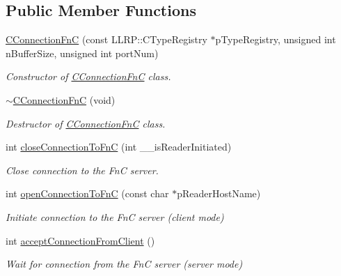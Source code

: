 \subsection*{Public Member Functions}
\begin{DoxyCompactItemize}
\item 
\hyperlink{class_e_l_f_i_n_1_1_c_connection_fn_c_a7f75c79f20a7d439266094d826dfca23}{C\-Connection\-Fn\-C} (const L\-L\-R\-P\-::\-C\-Type\-Registry $\ast$p\-Type\-Registry, unsigned int n\-Buffer\-Size, unsigned int port\-Num)
\begin{DoxyCompactList}\small\item\em Constructor of \hyperlink{class_e_l_f_i_n_1_1_c_connection_fn_c}{C\-Connection\-Fn\-C} class. \end{DoxyCompactList}\item 
\hyperlink{class_e_l_f_i_n_1_1_c_connection_fn_c_a0f88955ac24427bc224c8970a3e40016}{$\sim$\-C\-Connection\-Fn\-C} (void)
\begin{DoxyCompactList}\small\item\em Destructor of \hyperlink{class_e_l_f_i_n_1_1_c_connection_fn_c}{C\-Connection\-Fn\-C} class. \end{DoxyCompactList}\item 
int \hyperlink{class_e_l_f_i_n_1_1_c_connection_fn_c_a36cce7a57378de89fc5a03fb39092348}{close\-Connection\-To\-Fn\-C} (int \-\_\-\-\_\-is\-Reader\-Initiated)
\begin{DoxyCompactList}\small\item\em Close connection to the Fn\-C server. \end{DoxyCompactList}\item 
int \hyperlink{class_e_l_f_i_n_1_1_c_connection_fn_c_aade173f8606de8d853344752b4e18678}{open\-Connection\-To\-Fn\-C} (const char $\ast$p\-Reader\-Host\-Name)
\begin{DoxyCompactList}\small\item\em Initiate connection to the Fn\-C server (client mode) \end{DoxyCompactList}\item 
int \hyperlink{class_e_l_f_i_n_1_1_c_connection_fn_c_a452088817621707bb340b6b4b67dc995}{accept\-Connection\-From\-Client} ()
\begin{DoxyCompactList}\small\item\em Wait for connection from the Fn\-C server (server mode) \end{DoxyCompactList}\end{DoxyCompactItemize}



